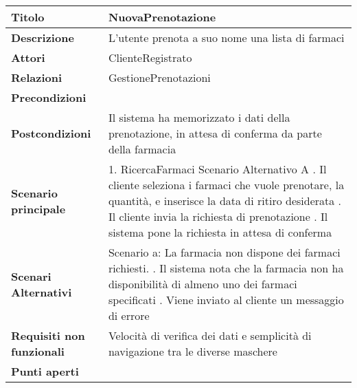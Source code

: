 \begin{tabular} {|P{4.5cm}|P{12.5cm}|}
\hline
  \textbf{Titolo} & NuovaPrenotazione\\
\hline
  \textbf{Descrizione} & L'utente prenota a suo nome una lista di farmaci\\
\hline
  \textbf{Attori} & ClienteRegistrato\\
\hline
  \textbf{Relazioni} & GestionePrenotazioni\\
\hline
  \textbf{Precondizioni} &\\
\hline
  \textbf{Postcondizioni} & Il sistema ha memorizzato i dati della prenotazione, in attesa di conferma da parte della farmacia\\
\hline
  \textbf{Scenario principale} & 1. RicercaFarmaci Scenario Alternativo A . Il cliente seleziona i farmaci che vuole prenotare, la quantità, e inserisce la data di ritiro desiderata . Il cliente invia la richiesta di prenotazione . Il sistema pone la richiesta in attesa di conferma\\
\hline
  \textbf{Scenari Alternativi} & Scenario a: La farmacia non dispone dei farmaci richiesti. . Il sistema nota che la farmacia non ha disponibilità di almeno uno dei farmaci specificati . Viene inviato al cliente un messaggio di errore\\
\hline
  \textbf{Requisiti non funzionali} & Velocità di verifica dei dati e semplicità di navigazione tra le diverse maschere\\
\hline
  \textbf{Punti aperti} &\\
\hline
\end{tabular}
\hfill
\break

